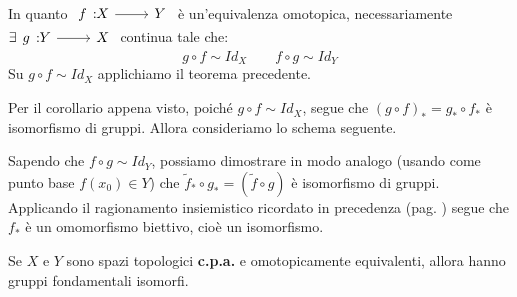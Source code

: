 \begin{demonstration}
In quanto $\funz{f}{X}{Y}$ è un'equivalenza omotopica, necessariamente $\exists \funz{g}{Y}{X}$ continua tale che:
\begin{equation*}
g\circ f\sim Id_X\qquad f\circ g\sim Id_Y
\end{equation*}
Su $g\circ f\sim Id_X$ applichiamo il teorema precedente.
\begin{center}
\end{center}
Per il corollario appena visto, poiché $g\circ f\sim Id_X$, segue che $\left(g\circ f\right)_{\ast}=g_\ast\circ f_\ast$ è isomorfismo di gruppi. Allora consideriamo lo schema seguente.
\begin{center}
\end{center}
Sapendo che $f\circ g\sim Id_Y$, possiamo dimostrare in modo analogo (usando come punto base $f\left(x_0\right)\in Y$) che $\widetilde{f}_\ast\circ g_\ast=\left(\widetilde{f}\circ g\right)$ è isomorfismo di gruppi.\\
Applicando il ragionamento insiemistico ricordato in precedenza (pag. \pageref{biettivitàinsiemi}) segue che $f_{\ast}$ è un omomorfismo biettivo, cioè un isomorfismo.
\end{demonstration}
\begin{corollary}
	Se $X$ e $Y$ sono spazi topologici \textbf{c.p.a.} e omotopicamente equivalenti, allora hanno gruppi fondamentali isomorfi.
\end{corollary}
